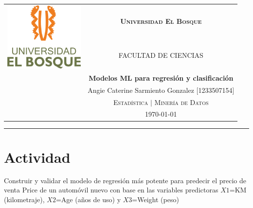 \documentclass[11pt,letterpaper]{article}\usepackage[]{graphicx}\usepackage[]{color}
\newcommand{\colorhrule}[3]{\begingroup\color{#1}\rule{#2}{#3}\endgroup}
\begin{document}
\sloppy     %
\begin{center}
\begin{tabular}{cc}
\multirow{2}{3.5cm}{\includegraphics[width=4cm]{UEBlogo.png}}	& \huge{\textsc{\textbf{Universidad El Bosque}}}\\ %
 & \scriptsize{\textsc{FACULTAD DE CIENCIAS}}\\[5mm]
 & \Large{\textsf{\textbf{Modelos ML para regresión y clasificación}}}\\
 & \small{\textsf{Angie Caterine Sarmiento Gonzalez [1233507154]}}\\ \vspace{5mm}
 & \small{\textsc{Estadística $|$ Minería de Datos}}\\
 & \today\\
\end{tabular}
\end{center}
	

\begin{center}
\colorhrule{black}{16.5cm}{1.2pt}
\end{center}

\section*{\textbf{Actividad}}

Construir y validar el modelo de regresión más potente para predecir el precio de venta Price de un automóvil nuevo con base en las variables predictoras $X1$=KM (kilometraje), $X2$=Age (años de uso) y $X3$=Weight (peso)
\end{document}
